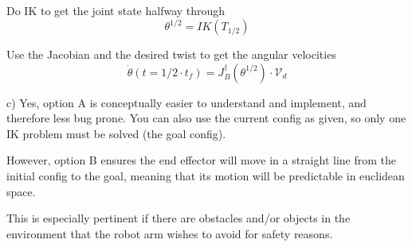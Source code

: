 \documentclass[11pt]{article}
\begin{document}
Do IK to get the joint state halfway through
\begin{equation}
	\theta^{1/2} = IK(T_{1/2})
\end{equation}

Use the Jacobian and the desired twist to get the angular velocities
\begin{equation}
	\dot \theta(t=1/2 \cdot t_f) = J_B^{\dagger}(\theta^{1/2}) \cdot \mathcal{V}_d
\end{equation}

c) 
Yes, option A is conceptually easier to understand and implement, and therefore less bug prone. You can also use the current config as given, so only one IK problem must be solved (the goal config).

However, option B ensures the end effector will move in a straight line from the initial config to the goal, meaning that its motion will be predictable in euclidean space. 

This is especially pertinent if there are obstacles and/or objects in the environment that the robot arm wishes to avoid for safety reasons.
\end{document}
